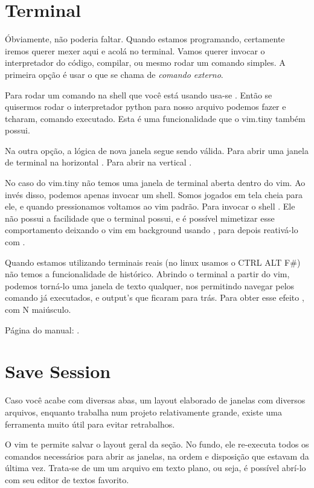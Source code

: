 \section{Terminal}
Óbviamente, não poderia faltar.
Quando estamos programando, certamente iremos querer mexer aqui e acolá no terminal.
Vamos querer invocar o interpretador do código, compilar, ou mesmo rodar um comando simples.
A primeira opção é usar o que se chama de \emph{comando externo}.

Para rodar um comando na shell que você está usando usa-se \vimcommand{:!
[comando]}. Então se quisermos rodar o interpretador python para nosso
arquivo podemos fazer  e tcharam, comando
executado. Esta é uma funcionalidade que o vim.tiny também possui.

Na outra opção, a lógica de nova janela segue sendo válida.
Para abrir uma janela de terminal na horizontal .
Para abrir na vertical .

No caso do vim.tiny não temos uma janela de terminal aberta dentro do vim.
Ao invés disso, podemos apenas invocar um shell. Somos jogados em tela cheia para ele,
e quando pressionamos  voltamos ao vim padrão.
Para invocar o shell .
Ele não possui a facilidade que o terminal possui, e é possível mimetizar esse comportamento
deixando o vim em background usando , para depois reativá-lo com
.


Quando estamos utilizando terminais reais (no linux usamos o CTRL ALT F\#)
não temos a funcionalidade de histórico.
Abrindo o terminal a partir do vim, podemos torná-lo uma janela de texto qualquer,
nos permitindo navegar pelos comando já executados, e output's que ficaram para trás.
Para obter esse efeito , com N maiúsculo.

Página do manual: .

\section{Save Session}
Caso você acabe com diversas abas, um layout elaborado de janelas com diversos arquivos,
enquanto trabalha num projeto relativamente grande, existe uma ferramenta muito útil para evitar
retrabalhos.

O vim te permite salvar o layout geral da seção.
No fundo, ele re-executa todos os comandos necessários para abrir as janelas,
na ordem e disposição que estavam da última vez.
Trata-se de um um arquivo em texto plano, ou seja, é possível abrí-lo com seu editor de textos favorito.

